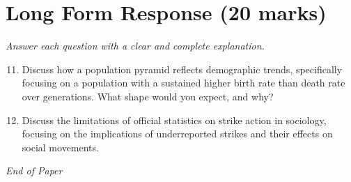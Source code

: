 \documentclass[12pt]{article}
\begin{document}
\section*{Long Form Response (20 marks)}
\textit{Answer each question with a clear and complete explanation.}
\begin{enumerate}[label=\arabic*.]
\setcounter{enumi}{10}
\item Discuss how a population pyramid reflects demographic trends, specifically focusing on a population with a sustained higher birth rate than death rate over generations. What shape would you expect, and why?
\item Discuss the limitations of official statistics on strike action in sociology, focusing on the implications of underreported strikes and their effects on social movements.
\end{enumerate}

\vfill
\noindent\textit{End of Paper}
\end{document}
